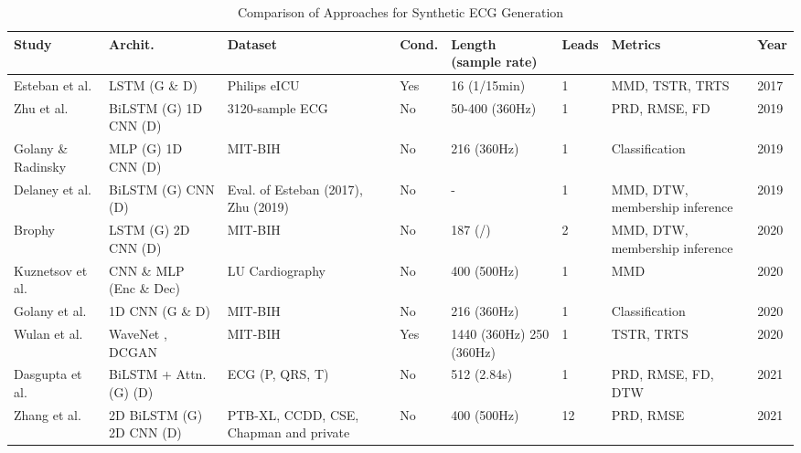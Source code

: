 \begin{table}[ht]
\centering
\caption{Comparison of Approaches for Synthetic ECG Generation}
\label{tab:ECG_comparison}
\small
\begin{tabular}{|p{1.5cm}|p{2.3cm}|p{1.8cm}|p{1cm}|p{1.8cm}|p{1cm}|p{1.8cm}|p{0.7cm}|}
\hline
\textbf{Study} & \textbf{Archit.} & \textbf{Dataset} & \textbf{Cond.} & \textbf{Length (sample rate)} & \textbf{Leads} & \textbf{Metrics} & \textbf{Year} \\
\hline
Esteban et al. \cite{estebanRealvaluedMedicalTime2017} & LSTM (G \& D) & Philips eICU & Yes & 16 (1/15min) & 1 & MMD, TSTR, TRTS & 2017 \\
\hline
Zhu et al. \cite{zhuElectrocardiogramGenerationBidirectional2019} & BiLSTM (G) 1D CNN (D) & 3120-sample ECG & No & 50-400 (360Hz) & 1 & PRD, RMSE, FD & 2019 \\
\hline
Golany \& Radinsky \cite{golanyPGANsPersonalizedGenerative2019} & MLP (G) 1D CNN (D) & MIT-BIH & No & 216 (360Hz) & 1 & Classification & 2019 \\
\hline
Delaney et al. \cite{delaneySynthesisRealisticECG2019} & BiLSTM (G) CNN (D) & Eval. of Esteban (2017), Zhu (2019) & No & - & 1 & MMD, DTW, membership inference & 2019 \\
\hline
Brophy \cite{brophySynthesisDependentMultichannel2020} & LSTM (G) 2D CNN (D) & MIT-BIH & No & 187 (/) & 2 & MMD, DTW, membership inference & 2020 \\
\hline
Kuznetsov et al. \cite{kuznetsovElectrocardiogramGenerationFeature2020} & CNN \& MLP (Enc \& Dec) & LU Cardiography & No & 400 (500Hz) & 1 & MMD & 2020 \\
\hline
Golany et al. \cite{golanySimGANsSimulatorBasedGenerative2020} & 1D CNN (G \& D) & MIT-BIH & No & 216 (360Hz) & 1 & Classification & 2020 \\
\hline
Wulan et al. \cite{wulanGeneratingElectrocardiogramSignals2020} & WaveNet \cite{oordWaveNetGenerativeModel2016}, DCGAN \cite{radfordUnsupervisedRepresentationLearning2016} & MIT-BIH & Yes & 1440 (360Hz) 250 (360Hz) & 1 & TSTR, TRTS & 2020 \\
\hline
Dasgupta et al. \cite{dasguptaCardioGANAttentionbasedGenerative2021} & BiLSTM + Attn. (G) (D) & ECG (P, QRS, T) & No & 512 (2.84s) & 1 & PRD, RMSE, FD, DTW & 2021 \\
\hline
Zhang et al. \cite{zhangSynthesisStandard12lead2021} & 2D BiLSTM (G) 2D CNN (D) & PTB-XL, CCDD, CSE, Chapman and private & No & 400 (500Hz) & 12 & PRD, RMSE & 2021 \\

\end{tabular}
\end{table}
